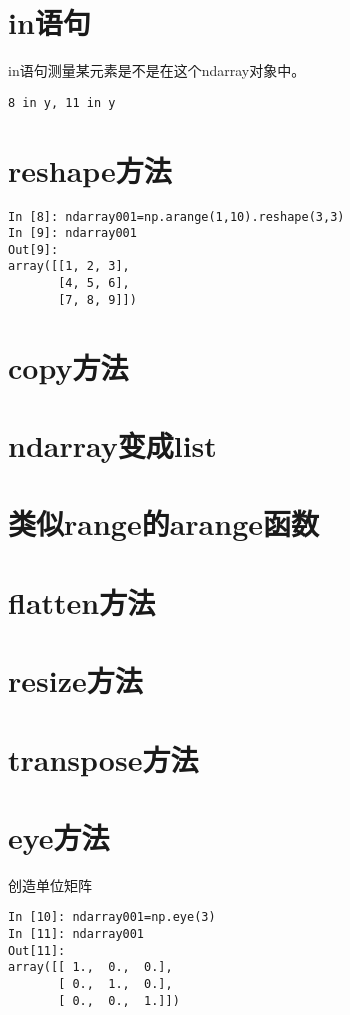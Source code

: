 \documentclass[12pt,oneside]{book}
\begin{document}
\begin{common-format}
\section{in语句}
in语句测量某元素是不是在这个ndarray对象中。
\begin{Verbatim}
8 in y, 11 in y
\end{Verbatim}

\section{reshape方法}
\begin{Verbatim}
In [8]: ndarray001=np.arange(1,10).reshape(3,3)
In [9]: ndarray001
Out[9]: 
array([[1, 2, 3],
       [4, 5, 6],
       [7, 8, 9]])
\end{Verbatim}




\section{copy方法}



\section{ndarray变成list}


\section{类似range的arange函数}

\section{flatten方法}


\section{resize方法}


\section{transpose方法}


\section{eye方法}
创造单位矩阵

\begin{Verbatim}
In [10]: ndarray001=np.eye(3)
In [11]: ndarray001
Out[11]: 
array([[ 1.,  0.,  0.],
       [ 0.,  1.,  0.],
       [ 0.,  0.,  1.]])


\end{Verbatim}
\end{common-format}
\end{document}
